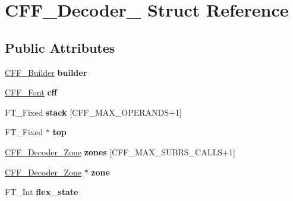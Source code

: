 \hypertarget{struct_c_f_f___decoder__}{}\section{C\+F\+F\+\_\+\+Decoder\+\_\+ Struct Reference}
\label{struct_c_f_f___decoder__}
\subsection*{Public Attributes}
\begin{DoxyCompactItemize}
\item 
\mbox{\label{struct_c_f_f___decoder___a1974266e7e164100b88c75fc05a15303}} 
\hyperlink{struct_c_f_f___builder__}{C\+F\+F\+\_\+\+Builder} {\bfseries builder}
\item 
\mbox{\label{struct_c_f_f___decoder___a543fe100eb6139211d33c57bc82c9faa}} 
\hyperlink{struct_c_f_f___font_rec__}{C\+F\+F\+\_\+\+Font} {\bfseries cff}
\item 
\mbox{\label{struct_c_f_f___decoder___afb0aead2fa8dcd179609394ce435007e}} 
F\+T\+\_\+\+Fixed {\bfseries stack} \mbox{[}C\+F\+F\+\_\+\+M\+A\+X\+\_\+\+O\+P\+E\+R\+A\+N\+DS+1\mbox{]}
\item 
\mbox{\label{struct_c_f_f___decoder___a3629bf05291a538fd649abab0848a39c}} 
F\+T\+\_\+\+Fixed $\ast$ {\bfseries top}
\item 
\mbox{\label{struct_c_f_f___decoder___a91ff8b4f9cb5d2275cc468972632aaac}} 
\hyperlink{struct_c_f_f___decoder___zone__}{C\+F\+F\+\_\+\+Decoder\+\_\+\+Zone} {\bfseries zones} \mbox{[}C\+F\+F\+\_\+\+M\+A\+X\+\_\+\+S\+U\+B\+R\+S\+\_\+\+C\+A\+L\+LS+1\mbox{]}
\item 
\mbox{\label{struct_c_f_f___decoder___a8b7e65540295938e9c3f466f8279849c}} 
\hyperlink{struct_c_f_f___decoder___zone__}{C\+F\+F\+\_\+\+Decoder\+\_\+\+Zone} $\ast$ {\bfseries zone}
\item 
\mbox{\label{struct_c_f_f___decoder___a2a6a5d625f137a69d839ffe9570e7b61}} 
F\+T\+\_\+\+Int {\bfseries flex\+\_\+state}

\end{DoxyCompactItemize}
